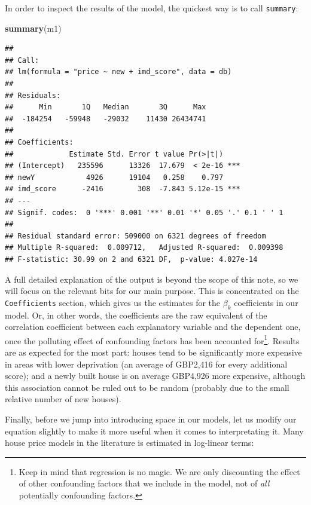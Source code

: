\documentclass[
]{book}
\newenvironment{Shaded}{\begin{snugshade}}{\end{snugshade}}
\newcommand{\KeywordTok}[1]{\textcolor[rgb]{0.13,0.29,0.53}{\textbf{#1}}}
\newcommand{\NormalTok}[1]{#1}
\begin{document}
In order to inspect the results of the model, the quickest way is to call \texttt{summary}:

\begin{Shaded}
\begin{Highlighting}[]
\KeywordTok{summary}\NormalTok{(m1)}
\end{Highlighting}
\end{Shaded}

\begin{verbatim}
## 
## Call:
## lm(formula = "price ~ new + imd_score", data = db)
## 
## Residuals:
##      Min       1Q   Median       3Q      Max 
##  -184254   -59948   -29032    11430 26434741 
## 
## Coefficients:
##             Estimate Std. Error t value Pr(>|t|)    
## (Intercept)   235596      13326  17.679  < 2e-16 ***
## newY            4926      19104   0.258    0.797    
## imd_score      -2416        308  -7.843 5.12e-15 ***
## ---
## Signif. codes:  0 '***' 0.001 '**' 0.01 '*' 0.05 '.' 0.1 ' ' 1
## 
## Residual standard error: 509000 on 6321 degrees of freedom
## Multiple R-squared:  0.009712,   Adjusted R-squared:  0.009398 
## F-statistic: 30.99 on 2 and 6321 DF,  p-value: 4.027e-14
\end{verbatim}

A full detailed explanation of the output is beyond the scope of this note, so we will focus on the relevant bits for our main purpose. This is concentrated on the \texttt{Coefficients} section, which gives us the estimates for the \(\beta_k\) coefficients in our model. Or, in other words, the coefficients are the raw equivalent of the correlation coefficient between each explanatory variable and the dependent one, once the polluting effect of confounding factors has been accounted for\footnote{Keep in mind that regression is no magic. We are only discounting the effect of other confounding factors that we include in the model, not of \emph{all} potentially confounding factors.}. Results are as expected for the most part: houses tend to be significantly more expensive in areas with lower deprivation (an average of GBP2,416 for every additional score); and a newly built house is on average GBP4,926 more expensive, although this association cannot be ruled out to be random (probably due to the small relative number of new houses).

Finally, before we jump into introducing space in our models, let us modify our equation slightly to make it more useful when it comes to interpretating it. Many house price models in the literature is estimated in log-linear terms:
\end{document}
